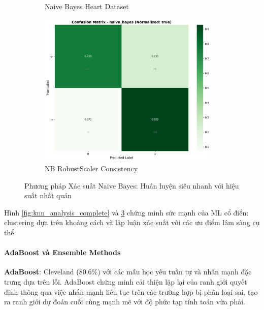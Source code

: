 \begin{figure}[H]
\begin{subfigure}[b]{0.31\textwidth}
\caption{Naive Bayes Heart Dataset}
\label{fig:nb_heart_performance}
\end{subfigure}
\hfill
\begin{subfigure}[b]{0.31\textwidth}
\centering
\includegraphics[width=0.95\textwidth]{Result/cleveland_dataset/confusion_matrices/naive_bayes_numeric_dataset_RobustScaler.png}
\caption{NB RobustScaler Consistency}
\label{fig:nb_robust_performance}
\end{subfigure}
\caption{Phương pháp Xác suất Naive Bayes: Huấn luyện siêu nhanh với hiệu suất nhất quán}
\label{fig:naive_bayes_complete}
\end{figure}

Hình \ref{fig:knn_analysis_complete} và \ref{fig:naive_bayes_complete} chứng minh sức mạnh của ML cổ điển: clustering dựa trên khoảng cách và lập luận xác suất với các ưu điểm lâm sàng cụ thể.

\paragraph{AdaBoost và Ensemble Methods}

\textbf{AdaBoost}: Cleveland (80.6\%) với các mẫu học yếu tuần tự và nhấn mạnh đặc trưng dựa trên lỗi. AdaBoost chứng minh cải thiện lặp lại của ranh giới quyết định thông qua việc nhấn mạnh liên tục trên các trường hợp bị phân loại sai, tạo ra ranh giới dự đoán cuối cùng mạnh mẽ với độ phức tạp tính toán vừa phải.

